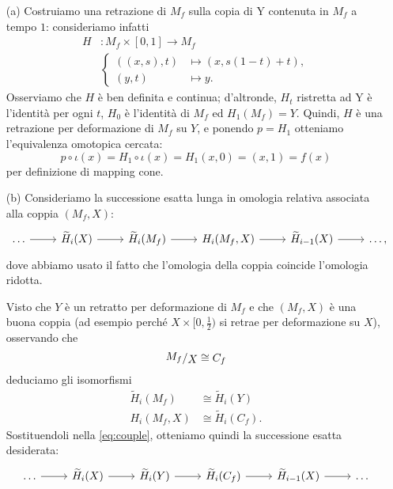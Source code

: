 \documentclass[a4paper]{article}
\newcommand{\ssfrac}[2]{
	\raisebox{+0.3ex}{$#1$}
	/
	\raisebox{-0.3ex}{$#2$}
}
\theoremstyle{definition}
\theoremstyle{definition}
\theoremstyle{remark}
\theoremstyle{definition}
\begin{document}
\begin{itemize}
    \item[(a)] Costruiamo una retrazione di $M_f$ sulla copia di Y contenuta in $M_f$ a tempo $1$: consideriamo infatti
        \begin{align*}
            H & : M_f \times [0,1]  \to M_f          \\
              & \begin{cases}
                    ((x,s),t) & \mapsto (x, s(1-t) + t), \\
                    (y,t)     & \mapsto y.
                \end{cases}
        \end{align*}
        Osserviamo che $H$ è ben definita e continua; d'altronde, $H_t$ ristretta ad Y è l'identità per ogni $t$, $H_0$ è l'identità di $M_f$ ed $H_1(M_f)=Y$. Quindi, $H$ è una retrazione per deformazione di $M_f$ su $Y$, e ponendo $p=H_1$ otteniamo l'equivalenza omotopica cercata:
        \[
            p\circ \iota (x) = H_1\circ \iota (x) = H_1(x,0) = (x,1) = f(x)
        \]
        per definizione di mapping cone.

    \item[(b)] Consideriamo la successione esatta lunga in omologia relativa associata alla coppia $(M_f, X)$:
        \begin{equation}\label{eq:couple}
            \begin{tikzcd}
                \dots \arrow[r] & \widetilde{H}_i(X) \arrow[r] & \widetilde{H}_i(M_f) \arrow[r] & H_i(M_f, X) \arrow[r] & \widetilde{H}_{i-1}(X) \arrow[r] & \dots,
            \end{tikzcd}
        \end{equation}
        dove abbiamo usato il fatto che l'omologia della coppia coincide l'omologia ridotta.

        Visto che $Y$ è un retratto per deformazione di $M_f$ e che $(M_f, X)$ è una buona coppia (ad esempio perché $X\times [0,\frac{1}{2})$ si retrae per deformazione su $X$),
        osservando che
        \[
            \ssfrac{M_f}{X} \cong C_f
        \]
        deduciamo gli isomorfismi
        \begin{align*}
            \widetilde{H}_i(M_f) & \cong  \widetilde{H}_i(Y)   \\
            H_i(M_f, X)          & \cong \widetilde{H}_i(C_f).
        \end{align*}
        Sostituendoli nella \eqref{eq:couple}, otteniamo quindi la successione esatta desiderata:
        \[
            \begin{tikzcd}
                \dots \arrow[r] & \widetilde{H}_i(X) \arrow[r] & \widetilde{H}_i(Y) \arrow[r] & \widetilde{H}_i(C_f) \arrow[r] & \widetilde{H}_{i-1}(X) \arrow[r] & \dots
            \end{tikzcd}
        \]
\end{itemize}
\end{document}

